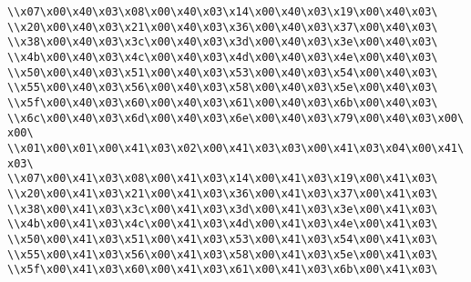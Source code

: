 \verb|\\x07\x00\x40\x03\x08\x00\x40\x03\x14\x00\x40\x03\x19\x00\x40\x03\|\newline
\verb|\\x20\x00\x40\x03\x21\x00\x40\x03\x36\x00\x40\x03\x37\x00\x40\x03\|\newline
\verb|\\x38\x00\x40\x03\x3c\x00\x40\x03\x3d\x00\x40\x03\x3e\x00\x40\x03\|\newline
\verb|\\x4b\x00\x40\x03\x4c\x00\x40\x03\x4d\x00\x40\x03\x4e\x00\x40\x03\|\newline
\verb|\\x50\x00\x40\x03\x51\x00\x40\x03\x53\x00\x40\x03\x54\x00\x40\x03\|\newline
\verb|\\x55\x00\x40\x03\x56\x00\x40\x03\x58\x00\x40\x03\x5e\x00\x40\x03\|\newline
\verb|\\x5f\x00\x40\x03\x60\x00\x40\x03\x61\x00\x40\x03\x6b\x00\x40\x03\|\newline
\verb|\\x6c\x00\x40\x03\x6d\x00\x40\x03\x6e\x00\x40\x03\x79\x00\x40\x03\x00\x00\|\newline
\verb|\\x01\x00\x01\x00\x41\x03\x02\x00\x41\x03\x03\x00\x41\x03\x04\x00\x41\x03\|\newline
\verb|\\x07\x00\x41\x03\x08\x00\x41\x03\x14\x00\x41\x03\x19\x00\x41\x03\|\newline
\verb|\\x20\x00\x41\x03\x21\x00\x41\x03\x36\x00\x41\x03\x37\x00\x41\x03\|\newline
\verb|\\x38\x00\x41\x03\x3c\x00\x41\x03\x3d\x00\x41\x03\x3e\x00\x41\x03\|\newline
\verb|\\x4b\x00\x41\x03\x4c\x00\x41\x03\x4d\x00\x41\x03\x4e\x00\x41\x03\|\newline
\verb|\\x50\x00\x41\x03\x51\x00\x41\x03\x53\x00\x41\x03\x54\x00\x41\x03\|\newline
\verb|\\x55\x00\x41\x03\x56\x00\x41\x03\x58\x00\x41\x03\x5e\x00\x41\x03\|\newline
\verb|\\x5f\x00\x41\x03\x60\x00\x41\x03\x61\x00\x41\x03\x6b\x00\x41\x03\|\newline
